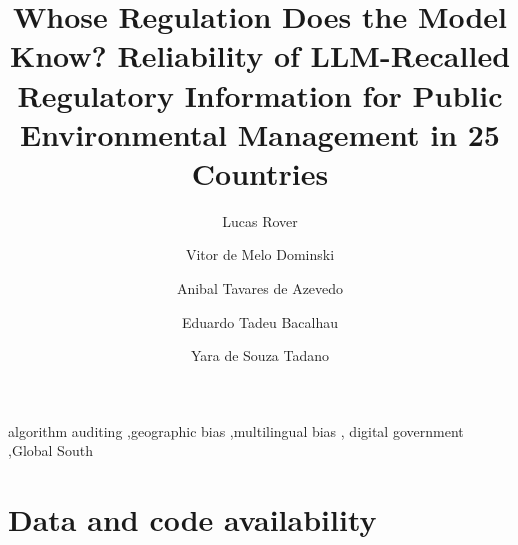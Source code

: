 \documentclass[review,authoryear,12pt]{elsarticle}
\begin{document}
\begin{frontmatter}

\title{Whose Regulation Does the Model Know? Reliability of LLM-Recalled
Regulatory Information for Public Environmental Management in 25 Countries}

\author[utfpr]{Lucas Rover}

\author[desc]{Vitor de Melo Dominski}
\author[unicamp]{Anibal Tavares de Azevedo}
\author[ufpr]{Eduardo Tadeu Bacalhau}
\author[utfpr]{Yara de Souza Tadano}




\begin{keyword}
algorithm auditing \sep geographic bias \sep multilingual bias \sep
digital government \sep Global South
\end{keyword}

\end{frontmatter}









\section*{Data and code availability}
\end{document}
